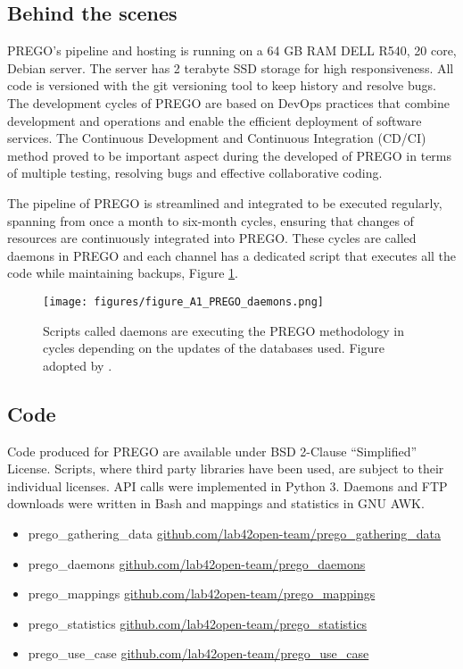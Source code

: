 \subsection{Behind the scenes}
\label{deamons}

PREGO's pipeline and hosting is running on a 64 GB RAM DELL R540, 20 core, Debian server.
The server has 2 terabyte SSD storage for high responsiveness. 
All code is versioned with the git versioning tool to keep history and 
resolve bugs. The development cycles of PREGO are based on DevOps practices that
combine development and operations and enable the efficient deployment of software services.
The Continuous Development and Continuous Integration (CD/CI) method proved to be
important aspect during the developed of PREGO in terms of multiple testing,
resolving bugs and effective collaborative coding. 

The pipeline of PREGO is streamlined and integrated to be executed regularly,
spanning from once a month to six-month cycles, ensuring that changes of resources are
continuously integrated into PREGO. These cycles are called daemons in PREGO and 
each channel has a dedicated script that executes all the code while 
maintaining backups, Figure \ref{fig:devops}.


\begin{figure}[hbt!]
   \centering
   \texttt{[image: figures/figure\_A1\_PREGO\_daemons.png]}
   \caption[PREGO DevOps]{Scripts called daemons are executing the PREGO methodology in cycles depending on the updates of the databases used. Figure adopted by \parencite{microorganisms10020293}.}
   \label{fig:devops}
\end{figure}


   \subsection{Code} 
Code produced for PREGO are available under BSD 2-Clause “Simplified” License.
Scripts, where third party libraries have been used, are subject to their individual licenses.
API calls were implemented in Python 3. Daemons and FTP downloads were written in Bash and 
mappings and statistics in GNU AWK.
   
   \begin{itemize}
      \item prego\_gathering\_data 
      \href{https://github.com/lab42open-team/prego_gathering_data}{github.com/lab42open-team/prego\_gathering\_data}
      \item prego\_daemons \href{https://github.com/lab42open-team/prego_daemons}{github.com/lab42open-team/prego\_daemons}
      \item prego\_mappings \href{https://github.com/lab42open-team/prego_mappings}{github.com/lab42open-team/prego\_mappings} 
      \item prego\_statistics \href{https://github.com/lab42open-team/prego_statistics}{github.com/lab42open-team/prego\_statistics}
      \item prego\_use\_case \href{https://github.com/lab42open-team/prego_use_case}{github.com/lab42open-team/prego\_use\_case}
   \end{itemize}


